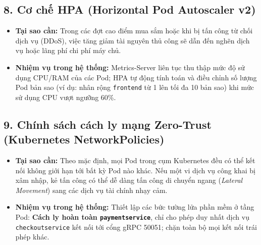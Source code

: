 \subsection{8. Cơ chế HPA (Horizontal Pod Autoscaler v2)}
\begin{itemize}
    \item \textbf{Tại sao cần:} Trong các đợt cao điểm mua sắm hoặc khi bị tấn công từ chối dịch vụ (DDoS), việc tăng giảm tài nguyên thủ công sẽ dẫn đến nghẽn dịch vụ hoặc lãng phí chi phí máy chủ.
    \item \textbf{Nhiệm vụ trong hệ thống:} Metrics-Server liên tục thu thập mức độ sử dụng CPU/RAM của các Pod; HPA tự động tính toán và điều chỉnh số lượng Pod bản sao (ví dụ: nhân rộng \texttt{frontend} từ 1 lên tối đa 10 bản sao) khi mức sử dụng CPU vượt ngưỡng 60\%.
\end{itemize}

\subsection{9. Chính sách cách ly mạng Zero-Trust (Kubernetes NetworkPolicies)}
\begin{itemize}
    \item \textbf{Tại sao cần:} Theo mặc định, mọi Pod trong cụm Kubernetes đều có thể kết nối không giới hạn tới bất kỳ Pod nào khác. Nếu một vi dịch vụ công khai bị xâm nhập, kẻ tấn công có thể dễ dàng tấn công di chuyển ngang (\textit{Lateral Movement}) sang các dịch vụ tài chính nhạy cảm.
    \item \textbf{Nhiệm vụ trong hệ thống:} Thiết lập các bức tường lửa phần mềm ở tầng Pod: \textbf{Cách ly hoàn toàn \texttt{paymentservice}}, chỉ cho phép duy nhất dịch vụ \texttt{checkoutservice} kết nối tới cổng gRPC 50051; chặn toàn bộ mọi kết nối trái phép khác.
\end{itemize}
